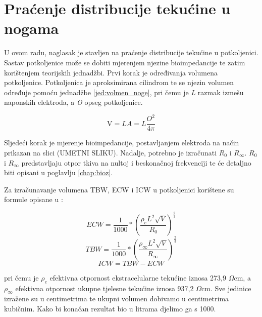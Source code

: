 \documentclass[../diplomski_rad.tex]{subfiles}
\begin{document}
\section{Praćenje distribucije tekućine u nogama}

U ovom radu, naglasak je stavljen na praćenje distribucije tekućine u potkoljenici. 
Sastav potkoljenice može se dobiti mjerenjem njezine bioimpedancije te zatim korištenjem teorijskih jednadžbi. 
Prvi korak je određivanja volumena potkoljenice. 
Potkoljenica je aproksimirana cilindrom te se njezin volumen određuje pomoću jednadžbe \ref{jed:volmen_noge}, 
pri čemu je \textit{L} razmak izmešu naponskih elektroda, a \textit{O} opseg potkoljenice.

\begin{equation}
    \label{jed:volmen_noge}
    \mathrm{V}=L A=L \frac{O^2}{4 \pi}
\end{equation} 

Sljedeći korak je mjerenje bioimpedancije, postavljanjem elektroda na način prikazan na slici (UMETNI SLIKU). 
Nadalje, potrebno je izračunati $R_{0}$ i $R_{\infty}$.
$R_{0}$ i $R_{\infty}$ predstavljaju otpor tkiva na nultoj i beskonačnoj frekvenciji te će detaljno biti opisani u poglavlju \ref{chap:bioz}.

Za izračunavanje volumena TBW, ECW i ICW u potkoljenici korištene su formule opisane u \cite{Delano2022}:

\begin{equation}
    \label{jed:ecw_noge}
    ECW=\frac{1}{1000} *\left(\frac{\rho_e L^2 \sqrt{V}}{R_0}\right)^{\frac{2}{3}}
\end{equation} 
\begin{equation}
    \label{jed:tbw_noge}
    TBW=\frac{1}{1000} *\left(\frac{\rho_{\infty} L^2 \sqrt{V}}{R_{\infty}}\right)^{\frac{2}{3}}
\end{equation} 
\begin{equation}
    \label{jed:icw_noge}
    ICW=TBW-ECW 
\end{equation} 

pri čemu je $\rho_{e}$ efektivna otpornost ekstracelularne tekućine iznosa 273,9 $\Omega$cm, a 
$\rho_{\infty}$ efektivna otpornost ukupne tjelesne tekućine iznosa 937,2 $\Omega$cm.
Sve jedinice izražene su u centimetrima te ukupni volumen dobivamo u centimetrima kubičnim. 
Kako bi konačan rezultat bio u litrama djelimo ga s 1000. 
\end{document}
